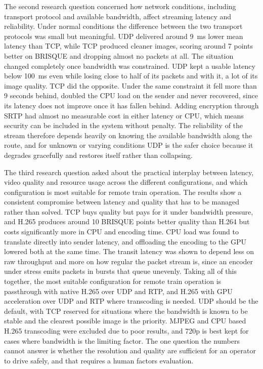 The second research question concerned how network conditions, including transport protocol and available bandwidth, affect streaming latency and reliability. Under normal conditions the difference between the two transport protocols was small but meaningful. UDP delivered around 9~ms lower mean latency than TCP, while TCP produced cleaner images, scoring around 7 points better on BRISQUE and dropping almost no packets at all. The situation changed completely once bandwidth was constrained. UDP kept a usable latency below 100~ms even while losing close to half of its packets and with it, a lot of its image quality. TCP did the opposite. Under the same constraint it fell more than 9 seconds behind, doubled the CPU load on the sender and never recovered, since its latency does not improve once it has fallen behind. Adding encryption through SRTP had almost no measurable cost in either latency or CPU, which means security can be included in the system without penalty. The reliability of the stream therefore depends heavily on knowing the available bandwidth along the route, and for unknown or varying conditions UDP is the safer choice because it degrades gracefully and restores itself rather than collapsing.

The third research question asked about the practical interplay between latency, video quality and resource usage across the different configurations, and which configuration is most suitable for remote train operation. The results show a consistent compromise between latency and quality that has to be managed rather than solved. TCP buys quality but pays for it under bandwidth pressure, and H.265 produces around 10 BRISQUE points better quality than H.264 but costs significantly more in CPU and encoding time. CPU load was found to translate directly into sender latency, and offloading the encoding to the GPU lowered both at the same time. The transit latency was shown to depend less on raw throughput and more on how regular the packet stream is, since an encoder under stress emits packets in bursts that queue unevenly. Taking all of this together, the most suitable configuration for remote train operation is passthrough with native H.265 over UDP and RTP, and H.265 with GPU acceleration over UDP and RTP where transcoding is needed. UDP should be the default, with TCP reserved for situations where the bandwidth is known to be stable and the clearest possible image is the priority. MJPEG and CPU based H.265 transcoding were excluded due to poor results, and 720p is best kept for cases where bandwidth is the limiting factor. The one question the numbers cannot answer is whether the resolution and quality are sufficient for an operator to drive safely, and that requires a human factors evaluation.

